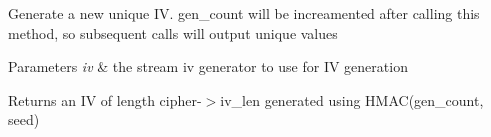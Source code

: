 Generate a new unique IV. gen\+\_\+count will be increamented after calling this method, so subsequent calls will output unique values


\begin{DoxyParams}{Parameters}
{\em iv} & the stream iv generator to use for IV generation \\
\hline
\end{DoxyParams}
\begin{DoxyReturn}{Returns}
an IV of length \textquotesingle{}cipher\textquotesingle{}-\/$>$iv\+\_\+len generated using H\+M\+A\+C(gen\+\_\+count, seed) 
\end{DoxyReturn}
